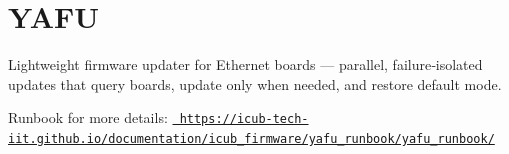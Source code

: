 \chapter{YAFU}
\hypertarget{md_icub-main_2src_2tools_2yafu_2README}{}\label{md_icub-main_2src_2tools_2yafu_2README}
Lightweight firmware updater for  Ethernet boards — parallel, failure‑isolated updates that query boards, update only when needed, and restore default mode.

Runbook for more details\+: \href{https://icub-tech-iit.github.io/documentation/icub_firmware/yafu_runbook/yafu_runbook/}{\texttt{ https\+://icub-\/tech-\/iit.\+github.\+io/documentation/icub\+\_\+firmware/yafu\+\_\+runbook/yafu\+\_\+runbook/}} 